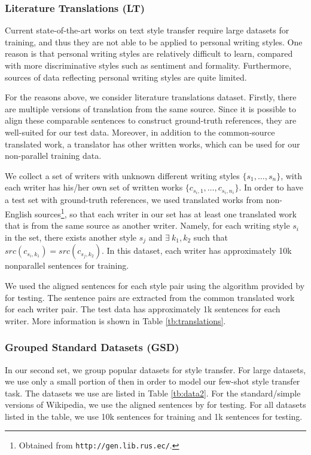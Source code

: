 \subsubsection*{Literature Translations (LT)}
\label{sec:lt}

Current state-of-the-art works on text style transfer require large datasets for training, and thus they are not able to be applied to personal writing styles. One reason is that personal writing styles are relatively difficult to learn, compared with more discriminative styles such as sentiment and formality. Furthermore, sources of data reflecting personal writing styles are quite limited. 

For the reasons above, we consider literature translations dataset. Firstly, there are multiple versions of translation from the same source. Since it is possible to align these comparable sentences to construct ground-truth references, they are well-suited for our test data. Moreover, in addition to the common-source translated work, a translator has other written works, which can be used for our non-parallel training data.

We collect a set of writers with unknown different writing styles $\{s_1, \ldots, s_n\}$, with each writer has his/her own set of written works $\{c_{s_i, 1}, \ldots, c_{s_i, n_i} \}$. In order to have a test set with ground-truth references, we used translated works from non-English sources\footnote{Obtained from \texttt{http://gen.lib.rus.ec/}.}, so that each writer in our set has at least one translated work that is from the same source as another writer. Namely, for each writing style $s_i$ in the set, there exists another style $s_j$ and $\exists\ k_1, k_2$ such that $src(c_{s_i, k_1}) = src(c_{s_j, k_2})$. In this dataset, each writer has approximately 10k nonparallel sentences for training.

We used the aligned sentences for each style pair using the algorithm provided by \citet{chen2019align} for testing. The sentence pairs are extracted from the common translated work for each writer pair. The test data has approximately 1k sentences for each writer. More information is shown in Table \ref{tb:translations}.

\subsubsection*{Grouped Standard Datasets (GSD)}

In our second set, we group popular datasets for style transfer. For large datasets, we use only a small portion of then in order to model our few-shot style transfer task. The datasets we use are listed in Table \ref{tb:data2}. For the standard/simple versions of Wikipedia, we use the aligned sentences by \citet{hwang2015aligning} for testing. For all datasets listed in the table, we use 10k sentences for training and 1k sentences for testing.

